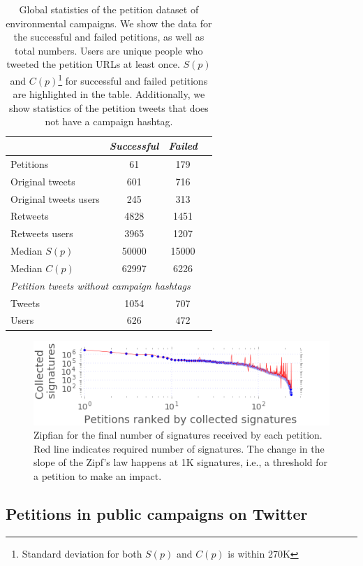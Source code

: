 \begin{table}[hbt!]
\centering
\begin{tabular}{lccc}
			& \textit{Successful} & \textit{Failed}	\\ \midrule
Petitions					& 61		& 179		\\
Original tweets				& 601		& 716		\\
Original tweets users 		& 245		& 313		\\
Retweets						& 4828		& 1451 		\\
Retweets users				& 3965		& 1207		\\
Median $S(p)$				& 50000		& 15000		\\
Median $C(p)$				& 62997		& 6226		\\
\multicolumn{3}{l}{\textit{Petition tweets without campaign hashtags}}	\\ \midrule
Tweets						& 1054		& 707		\\
Users 						& 626		& 472		\\
\end{tabular}
\caption{Global statistics of the petition dataset of environmental campaigns. We show the data for the successful and failed petitions, as well as total numbers. Users are unique people who tweeted the petition URLs at least once. $S(p)$ and $C(p)$\footnote{Standard deviation for both $S(p)$ and $C(p)$ is within 270K} for successful and failed petitions are highlighted in the table. Additionally, we show statistics of the petition tweets that does not have a campaign hashtag.}
\label{tab:petition_tweets}
\end{table}

\begin{figure}
\centering
\includegraphics[width=\columnwidth]{figures/petitionsVSrank.png}
\caption{Zipfian for the final number of signatures received by each petition. Red line indicates required number of signatures. The change in the slope of the Zipf's law happens at 1K signatures, i.e., a threshold for a petition to make an impact.}
\label{fig:signatures_vs_rank}
\end{figure}

\subsection{Petitions in public campaigns on Twitter}

